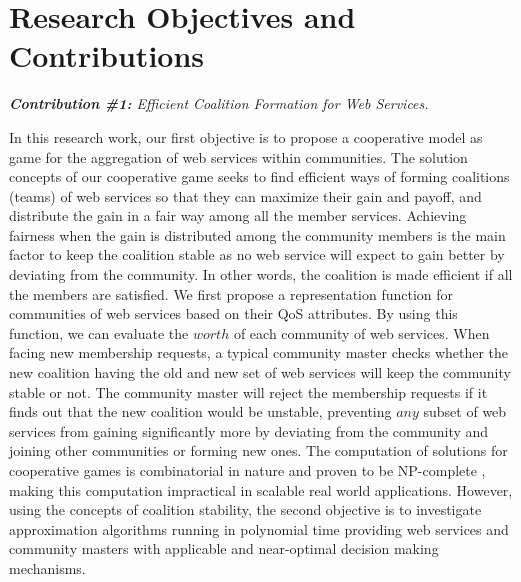 
\section{Research Objectives and Contributions}\label{sec:motexample}

\noindent \emph{\textbf{Contribution \#1:} Efficient Coalition Formation for Web Services\cite{10.1109/TSC.2014.2312940}.}

In this research work, our first objective is to propose a
cooperative model as game for the aggregation of web services
within communities. The solution concepts of our cooperative game
seeks to find efficient ways of forming coalitions (teams) of web
services so that they can maximize their gain and payoff, and
distribute the gain in a fair way among all the member services.
Achieving fairness when the gain is distributed among the
community members is the main factor to keep the coalition stable
as no web service will expect to gain better by deviating from the
community. In other words, the coalition is made efficient if all
the members are satisfied. We first propose a representation
function for communities of web services based on their QoS
attributes. By using this function, we can evaluate the $worth$ of
each community of web services. When facing new membership
requests, a typical community master checks whether the new
coalition having the old and new set of web services will keep the
community stable or not. The community master will reject the
membership requests if it finds out that the new coalition would
be unstable, preventing $any$ subset of web services from gaining
significantly more by deviating from the community and joining
other communities or forming new ones. The computation of
solutions for cooperative games is combinatorial in nature and
proven to be NP-complete \cite{Algorithmic}, making this
computation impractical in scalable real world applications. However, using
the concepts of coalition stability, the second objective is to
investigate approximation algorithms running in polynomial time
providing web services and community masters with applicable and
near-optimal decision making mechanisms.


